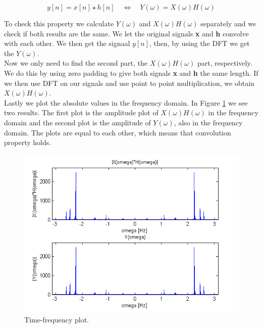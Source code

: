 \documentclass[final]{scrreprt} %
\begin{document}
\begin{equation}
y[n] = x[n]\star h[n] \quad \Leftrightarrow \quad Y(\omega) = X(\omega)H(\omega) 
\label{eq:convprop}
\end{equation}

To check this property we calculate $Y(\omega)$ and $X(\omega)H(\omega)$ separately and we check if both results are the same. 
We let the original signals \textbf{x} and \textbf{h} convolve with each other.
We then get the signaal $y[n]$, then, by using the DFT we get the $Y(\omega)$.\\
Now we only need to find the second part, the $X(\omega)H(\omega)$ part, respectively.
We do this by using zero padding to give both signals \textbf{x} and \textbf{h} the same length. 
If we then use DFT on our signals and use point to point multiplication, we obtain  $X(\omega)H(\omega)$.\\
Lastly we plot the absolute values in the frequency domain. 
In Figure \ref{fig:convpro} we see two results. 
The first plot is the amplitude plot of  $X(\omega)H(\omega)$ in the frequency domain and the second plot is the amplitude of $Y(\omega)$, also in the frequency domain.
The plots are equal to each other, which means that convolution property holds.


\begin{figure}[h]
\centering
\includegraphics[scale = 1.0]{resources/labday1/theconvolutionproperty.png}
\caption{Time-frequency plot.}
\label{fig:convpro}
\end{figure}
\end{document}
